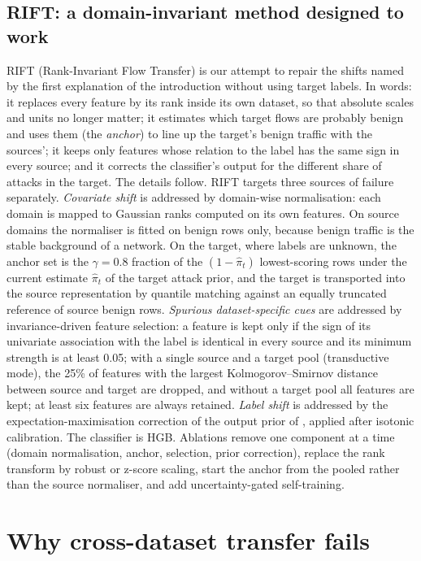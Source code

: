 \documentclass[pdflatex,sn-mathphys-num]{sn-jnl}%
\begin{document}
\subsection{RIFT: a domain-invariant method designed to work}\label{sec:rift}
RIFT (Rank-Invariant Flow Transfer) is our attempt to repair the shifts named by the first explanation of the introduction without using target labels.
In words: it replaces every feature by its rank inside its own dataset, so that absolute scales and units no longer matter; it estimates which target flows are probably benign and uses them (the \emph{anchor}) to line up the target's benign traffic with the sources'; it keeps only features whose relation to the label has the same sign in every source; and it corrects the classifier's output for the different share of attacks in the target.
The details follow.
RIFT targets three sources of failure separately.
\emph{Covariate shift} is addressed by domain-wise normalisation: each domain is mapped to Gaussian ranks computed on its own features.
On source domains the normaliser is fitted on benign rows only, because benign traffic is the stable background of a network.
On the target, where labels are unknown, the anchor set is the $\gamma=0.8$ fraction of the $(1-\hat\pi_t)$ lowest-scoring rows under the current estimate $\hat\pi_t$ of the target attack prior, and the target is transported into the source representation by quantile matching against an equally truncated reference of source benign rows.
\emph{Spurious dataset-specific cues} are addressed by invariance-driven feature selection: a feature is kept only if the sign of its univariate association with the label is identical in every source and its minimum strength is at least 0.05; with a single source and a target pool (transductive mode), the 25\% of features with the largest Kolmogorov--Smirnov distance between source and target are dropped, and without a target pool all features are kept; at least six features are always retained.
\emph{Label shift} is addressed by the expectation-maximisation correction of the output prior of \citet{saerens2002adjusting}, applied after isotonic calibration.
The classifier is HGB.
Ablations remove one component at a time (domain normalisation, anchor, selection, prior correction), replace the rank transform by robust or z-score scaling, start the anchor from the pooled rather than the source normaliser, and add uncertainty-gated self-training.

\section{Why cross-dataset transfer fails}\label{sec:results}
\end{document}
